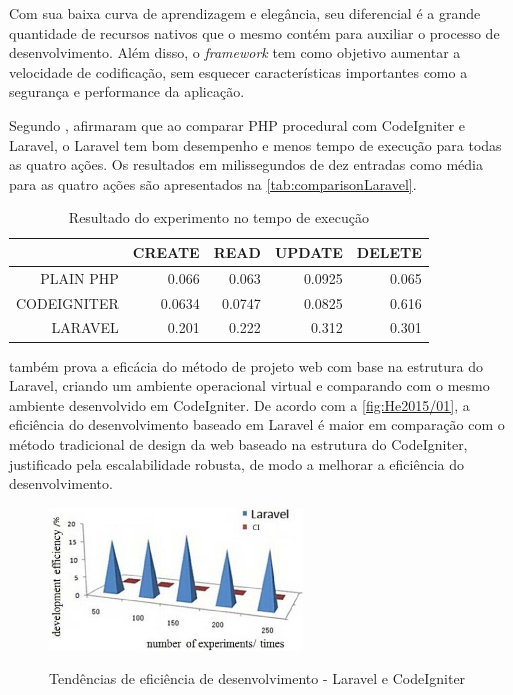 Com sua baixa curva de aprendizagem e elegância, seu diferencial é a grande quantidade de recursos nativos que o mesmo contém para auxiliar o processo de desenvolvimento. Além disso, o \textit{framework} tem como objetivo aumentar a velocidade de codificação, sem esquecer características importantes como a segurança e performance da aplicação.

Segundo , afirmaram que ao comparar PHP procedural com CodeIgniter e Laravel, o Laravel tem bom desempenho e menos tempo de execução para todas as quatro ações. Os resultados em milissegundos de dez entradas como média para as quatro ações são apresentados na \autoref{tab:comparisonLaravel}.

\begin{table}[H]
    \centering
    \caption{Resultado do experimento no tempo de execução
    \label{tab:comparisonLaravel}}
    \begin{tabular}{rrrrr}
            \toprule
            & CREATE    & READ      & UPDATE    & DELETE \\
            \midrule
            PLAIN PHP   & 0.066     & 0.063    & 0.0925   & 0.065 \\
            CODEIGNITER & 0.0634    & 0.0747   & 0.0825   & 0.616 \\
            LARAVEL     & 0.201     & 0.222    & 0.312    & 0.301 \\
            \bottomrule
    \end{tabular}
\end{table}

 também prova a eficácia do método de projeto web com base na estrutura do Laravel, criando um ambiente operacional virtual e comparando com o mesmo ambiente desenvolvido em CodeIgniter. De acordo com a \autoref{fig:He2015/01}, a eficiência do desenvolvimento baseado em Laravel é maior em comparação com o método tradicional de design da web baseado na estrutura do CodeIgniter, justificado pela escalabilidade robusta, de modo a melhorar a eficiência do desenvolvimento.

\begin{figure}[H]
    \centering
    \caption{Tendências de eficiência de desenvolvimento - Laravel e CodeIgniter}
    \includegraphics[width=0.6\textwidth]{./dados/figuras/fig9}
    \label{fig:He2015/01}
\end{figure}

